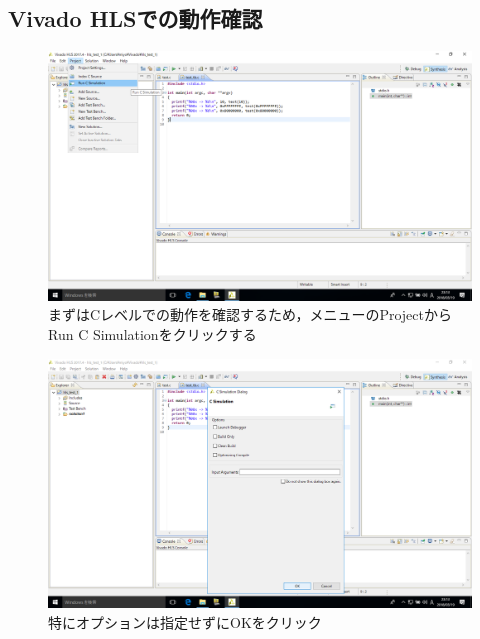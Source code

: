 \documentclass[a4paper,dvipdfmx]{jsarticle}
\begin{document}
 \subsection{Vivado HLSでの動作確認}

 \begin{figure}[H]
  \begin{center}
   \includegraphics[width=.8\textwidth]{chapter08_figures/VirtualBox_Windows10_19_03_2018_23_16_35.png}
  \end{center}
  \caption{まずはCレベルでの動作を確認するため，メニューのProjectからRun C Simulationをクリックする}
 \end{figure}

 \begin{figure}[H]
  \begin{center}
   \includegraphics[width=.8\textwidth]{chapter08_figures/VirtualBox_Windows10_19_03_2018_23_16_40.png}
  \end{center}
  \caption{特にオプションは指定せずにOKをクリック}
 \end{figure}
\end{document}
